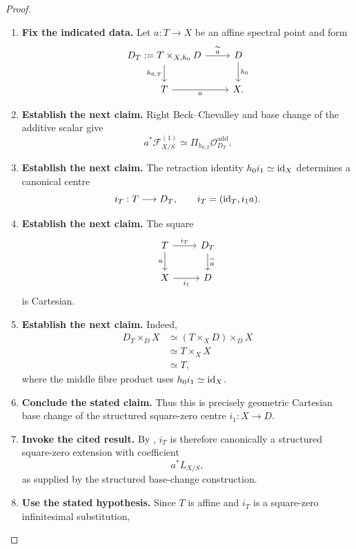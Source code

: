 \begin{proof}
\leavevmode
\begin{enumerate}[label=\textup{(\arabic*)}]
    \item \textbf{Fix the indicated data.}
    Let \(a:T\to X\) be an affine spectral point and form
    \[
    \begin{tikzcd}
    D_T:=T\times_{X,h_0}D
    \ar[r,"\widetilde a"]
    \ar[d,"h_{0,T}"']
    & D \ar[d,"h_0"]\\
    T \ar[r,"a"'] & X.
    \end{tikzcd}
    \]
    \item \textbf{Establish the next claim.}
    Right Beck--Chevalley and base change of the additive scalar give
    \[
    a^*\mathscr F^{(1)}_{X/S}
    \simeq
    \Pi_{h_{0,T}}\mathcal O_{D_T}^{\mathrm{add}}.
    \]
    \item \textbf{Establish the next claim.}
    The retraction identity \(h_0i_1\simeq\operatorname{id}_X\) determines a canonical centre
    \[
    i_T:T\longrightarrow D_T,
    \qquad
    i_T=(\operatorname{id}_T,i_1a).
    \]
    \item \textbf{Establish the next claim.}
    The square
    \[
    \begin{tikzcd}
    T \ar[r,"i_T"] \ar[d,"a"']
    & D_T \ar[d,"\widetilde a"]\\
    X \ar[r,"i_1"']
    & D
    \end{tikzcd}
    \]
    is Cartesian.
    \item \textbf{Establish the next claim.}
    Indeed,
    \[
    \begin{aligned}
    D_T\times_DX
    &\simeq
    (T\times_XD)\times_DX\\
    &\simeq
    T\times_XX\\
    &\simeq T,
    \end{aligned}
    \]
    where the middle fibre product uses \(h_0i_1\simeq\operatorname{id}_X\).
    \item \textbf{Conclude the stated claim.}
    Thus this is precisely geometric Cartesian base change of the structured
    square-zero centre \(i_1:X\to D\).
    \item \textbf{Invoke the cited result.}
    By
    , \(i_T\) is therefore
    canonically a structured square-zero extension with coefficient
    \[
    a^*L_{X/S},
    \]
    as supplied by the structured base-change construction.
    \item \textbf{Use the stated hypothesis.}
    Since \(T\) is affine and \(i_T\) is a square-zero infinitesimal substitution,

\end{enumerate}
\end{proof}
